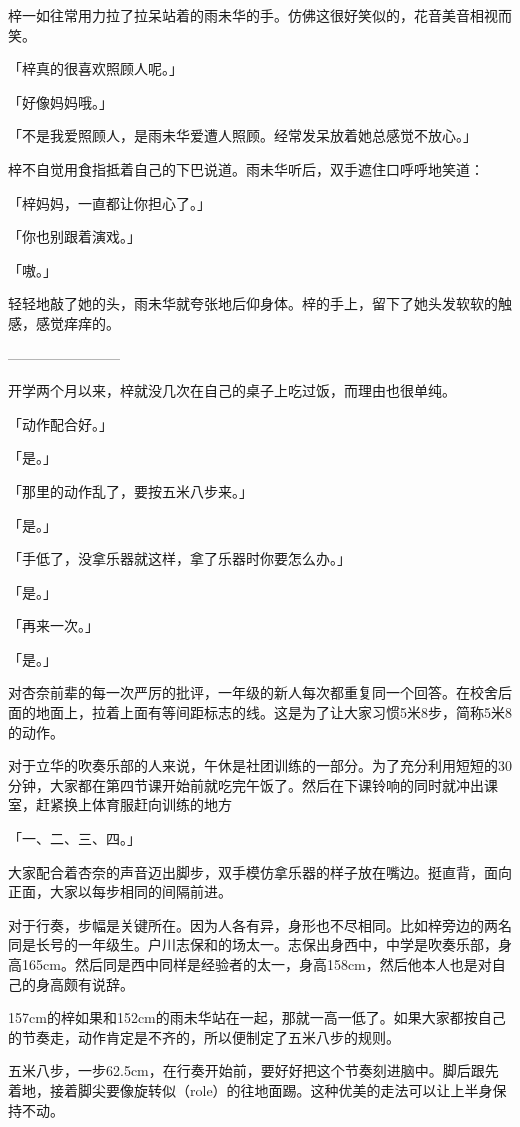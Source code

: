 \documentclass[UTF8]{ctexart}
\begin{document}
    梓一如往常用力拉了拉呆站着的雨未华的手。仿佛这很好笑似的，花音美音相视而笑。

    「梓真的很喜欢照顾人呢。」

    「好像妈妈哦。」

    「不是我爱照顾人，是雨未华爱遭人照顾。经常发呆放着她总感觉不放心。」

    梓不自觉用食指抵着自己的下巴说道。雨未华听后，双手遮住口呼呼地笑道：

    「梓妈妈，一直都让你担心了。」

    「你也别跟着演戏。」

    「嗷。」

    轻轻地敲了她的头，雨未华就夸张地后仰身体。梓的手上，留下了她头发软软的触感，感觉痒痒的。

    ————————

    开学两个月以来，梓就没几次在自己的桌子上吃过饭，而理由也很单纯。

    「动作配合好。」

    「是。」

    「那里的动作乱了，要按五米八步来。」

    「是。」

    「手低了，没拿乐器就这样，拿了乐器时你要怎么办。」

    「是。」

    「再来一次。」

    「是。」

    对杏奈前辈的每一次严厉的批评，一年级的新人每次都重复同一个回答。在校舍后面的地面上，拉着上面有等间距标志的线。这是为了让大家习惯5米8步，简称5米8的动作。

    对于立华的吹奏乐部的人来说，午休是社团训练的一部分。为了充分利用短短的30分钟，大家都在第四节课开始前就吃完午饭了。然后在下课铃响的同时就冲出课室，赶紧换上体育服赶向训练的地方

    「一、二、三、四。」

    大家配合着杏奈的声音迈出脚步，双手模仿拿乐器的样子放在嘴边。挺直背，面向正面，大家以每步相同的间隔前进。

    对于行奏，步幅是关键所在。因为人各有异，身形也不尽相同。比如梓旁边的两名同是长号的一年级生。户川志保和的场太一。志保出身西中，中学是吹奏乐部，身高165cm。然后同是西中同样是经验者的太一，身高158cm，然后他本人也是对自己的身高颇有说辞。

    157cm的梓如果和152cm的雨未华站在一起，那就一高一低了。如果大家都按自己的节奏走，动作肯定是不齐的，所以便制定了五米八步的规则。

    五米八步，一步62.5cm，在行奏开始前，要好好把这个节奏刻进脑中。脚后跟先着地，接着脚尖要像旋转似（role）的往地面踢。这种优美的走法可以让上半身保持不动。
\end{document}
